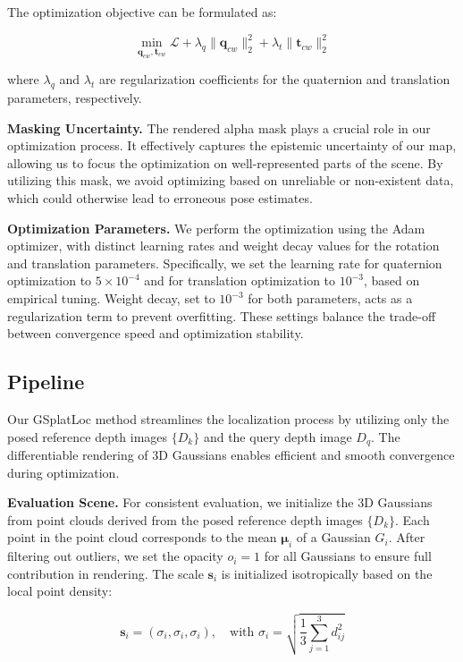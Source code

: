 \documentclass[twocolumn]{article}
\begin{document}
The optimization objective can be formulated as:

\[
\min_{\mathbf{q}_{cw}, \mathbf{t}_{cw}} \mathcal{L} + \lambda_q \|\mathbf{q}_{cw}\|_2^2 + \lambda_t \|\mathbf{t}_{cw}\|_2^2
\]

where \(\lambda_q\) and \(\lambda_t\) are regularization coefficients
for the quaternion and translation parameters, respectively.

\textbf{Masking Uncertainty.} The rendered alpha mask plays a crucial
role in our optimization process. It effectively captures the epistemic
uncertainty of our map, allowing us to focus the optimization on
well-represented parts of the scene. By utilizing this mask, we avoid
optimizing based on unreliable or non-existent data, which could
otherwise lead to erroneous pose estimates.

\textbf{Optimization Parameters.} We perform the optimization using the
Adam optimizer, with distinct learning rates and weight decay values for
the rotation and translation parameters. Specifically, we set the
learning rate for quaternion optimization to \(5 \times 10^{-4}\) and
for translation optimization to \(10^{-3}\), based on empirical tuning.
Weight decay, set to \(10^{-3}\) for both parameters, acts as a
regularization term to prevent overfitting. These settings balance the
trade-off between convergence speed and optimization stability.

\subsection{Pipeline}\label{pipeline}

Our GSplatLoc method streamlines the localization process by utilizing
only the posed reference depth images \(\{D_k\}\) and the query depth
image \(D_q\). The differentiable rendering of 3D Gaussians enables
efficient and smooth convergence during optimization.

\textbf{Evaluation Scene.} For consistent evaluation, we initialize the
3D Gaussians from point clouds derived from the posed reference depth
images \(\{D_k\}\). Each point in the point cloud corresponds to the
mean \(\boldsymbol{\mu}_i\) of a Gaussian \(G_i\). After filtering out
outliers, we set the opacity \(o_i = 1\) for all Gaussians to ensure
full contribution in rendering. The scale \(\mathbf{s}_i\) is
initialized isotropically based on the local point density:

\[
\mathbf{s}_i = (\sigma_i, \sigma_i, \sigma_i), \quad \text{with } \sigma_i = \sqrt{\frac{1}{3}\sum_{j=1}^3 d_{ij}^2}
\]
\end{document}
